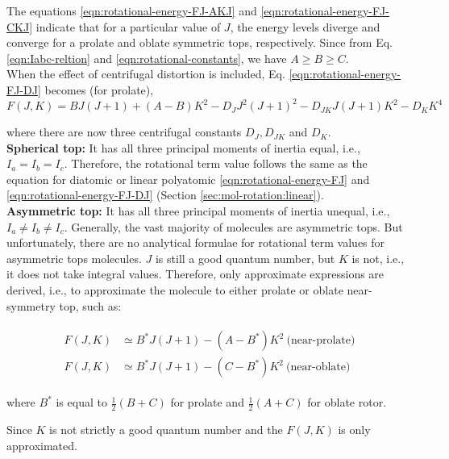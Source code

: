 The equations \ref{eqn:rotational-energy-FJ-AKJ} and \ref{eqn:rotational-energy-FJ-CKJ} indicate that for a particular value of $J$, the energy levels diverge and converge for a prolate and oblate symmetric tops, respectively. Since from Eq. \ref{eqn:Iabc-reltion} and \ref{eqn:rotational-constants}, we have $A \geq B \geq C$.\\

When the effect of centrifugal distortion is included, Eq. \ref{eqn:rotational-energy-FJ-DJ} becomes (for prolate),
\begin{equation}
    \label{eqn:rotational-energy-FJ-KJ}
    F(J, K) = BJ(J+1) + (A-B)K^2 - D_J J^2(J+1)^2 - D_{JK} J(J+1)K^2 - D_K K^4
\end{equation}

where there are now three centrifugal constants $D_J, D_{JK}$ and $D_K$.\\

\textbf{Spherical top: }It has all three principal moments of inertia equal, i.e., $I_a = I_b = I_c$. Therefore, the rotational term value follows the same as the equation for diatomic or linear polyatomic \ref{eqn:rotational-energy-FJ} and \ref{eqn:rotational-energy-FJ-DJ} (Section \ref{sec:mol-rotation:linear}).\\

\textbf{Asymmetric top: } It has all three principal moments of inertia unequal, i.e., $I_a \neq I_b \neq I_c $. Generally, the vast majority of molecules are asymmetric tops. But unfortunately, there are no analytical formulae for rotational term values for asymmetric tops molecules. $J$ is still a good quantum number, but $K$ is not, i.e., it does not take integral values. Therefore, only approximate expressions are derived, i.e., to approximate the molecule to either prolate or oblate near-symmetry top, such as:

\begin{align*}
    \begin{split}
        F(J, K) &\simeq B^* J(J+1) - (A-B^*)K^2\ \text{(near-prolate)} \\
        F(J, K) &\simeq B^* J(J+1) - (C-B^*)K^2\ \text{(near-oblate)}
    \end{split}
\end{align*}

where $B^*$ is equal to $\frac{1}{2} (B+C)$ for prolate and $\frac{1}{2} (A+C)$ for oblate rotor.

Since $K$ is not strictly a good quantum number and the $F(J, K)$ is only approximated.

